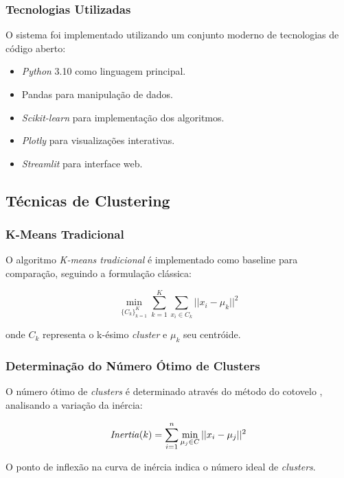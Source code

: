 \documentclass[conference]{IEEEtran}
\begin{document}
\subsubsection{Tecnologias Utilizadas}
O sistema foi implementado utilizando um conjunto moderno de tecnologias de código aberto:

\begin{itemize}
\item \textit{Python} 3.10 como linguagem principal.
\item Pandas para manipulação de dados.
\item \textit{Scikit-learn} para implementação dos algoritmos.
\item \textit{Plotly} para visualizações interativas.
\item \textit{Streamlit} para interface web.
\end{itemize}

\subsection{Técnicas de Clustering}

\subsubsection{K-Means Tradicional}
O algoritmo \textit{K-means tradicional} \cite{b3} é implementado como baseline para comparação, seguindo a formulação clássica:

\begin{equation}
\min_{\{C_k\}_{k=1}^K} \sum_{k=1}^K \sum_{x_i \in C_k} ||x_i - \mu_k||^2
\end{equation}

onde $C_k$ representa o k-ésimo \textit{cluster} e $\mu_k$ seu centróide.

\subsubsection{Determinação do Número Ótimo de Clusters}
O número ótimo de \textit{clusters} é determinado através do método do cotovelo \cite{b4}, analisando a variação da inércia:

\begin{equation}
\text{\textit{Inertia}}(k) = \sum_{i=1}^n \min_{\mu_j \in C} ||x_i - \mu_j||^2
\end{equation}

O ponto de inflexão na curva de inércia indica o número ideal de \textit{clusters}.
\end{document}
